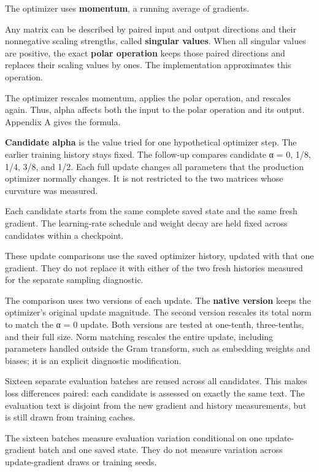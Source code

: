 \documentclass[
  14pt,
  letterpaper,
]{extarticle}
\begin{document}
The optimizer uses \textbf{momentum}, a running average of gradients.

Any matrix can be described by paired input and output directions and
their nonnegative scaling strengths, called \textbf{singular values}.
When all singular values are positive, the exact \textbf{polar
operation} keeps those paired directions and replaces their scaling
values by ones. The implementation approximates this operation.

The optimizer rescales momentum, applies the polar operation, and
rescales again. Thus, alpha affects both the input to the polar
operation and its output. Appendix A gives the formula.

\textbf{Candidate alpha} is the value tried for one hypothetical
optimizer step. The earlier training history stays fixed. The follow-up
compares candidate α = 0, 1/8, 1/4, 3/8, and 1/2. Each full update
changes all parameters that the production optimizer normally changes.
It is not restricted to the two matrices whose curvature was measured.

Each candidate starts from the same complete saved state and the same
fresh gradient. The learning-rate schedule and weight decay are held
fixed across candidates within a checkpoint.

These update comparisons use the saved optimizer history, updated with
that one gradient. They do not replace it with either of the two fresh
histories measured for the separate sampling diagnostic.

The comparison uses two versions of each update. The \textbf{native
version} keeps the optimizer's original update magnitude. The second
version rescales its total norm to match the α = 0 update. Both versions
are tested at one-tenth, three-tenths, and their full size. Norm
matching rescales the entire update, including parameters handled
outside the Gram transform, such as embedding weights and biases; it is
an explicit diagnostic modification.

Sixteen separate evaluation batches are reused across all candidates.
This makes loss differences paired: each candidate is assessed on
exactly the same text. The evaluation text is disjoint from the new
gradient and history measurements, but is still drawn from training
caches.

The sixteen batches measure evaluation variation conditional on one
update-gradient batch and one saved state. They do not measure variation
across update-gradient draws or training seeds.
\end{document}
